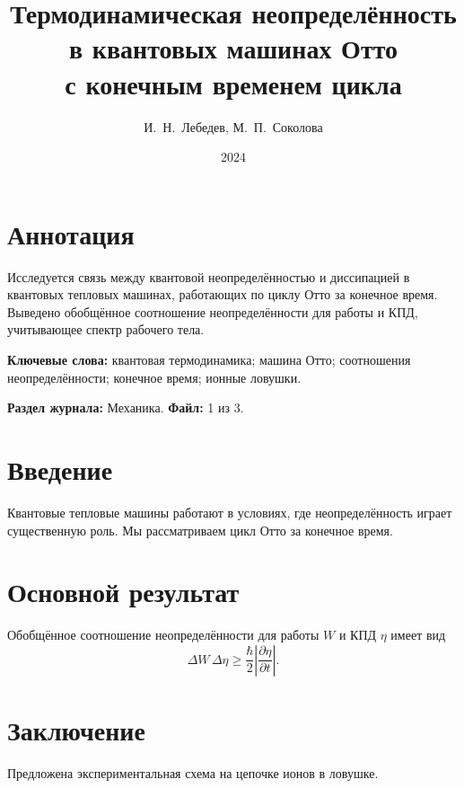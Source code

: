 \documentclass[12pt]{article}
\title{Термодинамическая неопределённость в квантовых машинах Отто\\ с конечным временем цикла}
\author{И.~Н.~Лебедев, М.~П.~Соколова}
\date{2024}
\begin{document}
\maketitle

\section*{Аннотация}
Исследуется связь между квантовой неопределённостью и диссипацией в квантовых тепловых машинах, работающих по циклу Отто за конечное время. Выведено обобщённое соотношение неопределённости для работы и КПД, учитывающее спектр рабочего тела.

\vspace{0.5cm}
\noindent\textbf{Ключевые слова:} квантовая термодинамика; машина Отто; соотношения неопределённости; конечное время; ионные ловушки.

\vspace{0.3cm}
\noindent\textbf{Раздел журнала:} Механика. \quad \textbf{Файл:} 1 из 3.

\section{Введение}
Квантовые тепловые машины работают в условиях, где неопределённость играет существенную роль. Мы рассматриваем цикл Отто за конечное время.

\section{Основной результат}
Обобщённое соотношение неопределённости для работы $W$ и КПД $\eta$ имеет вид
\begin{equation}
\Delta W \, \Delta \eta \geq \frac{\hbar}{2} \left| \frac{\partial \eta}{\partial t} \right|.
\end{equation}

\section{Заключение}
Предложена экспериментальная схема на цепочке ионов в ловушке.
\end{document}
